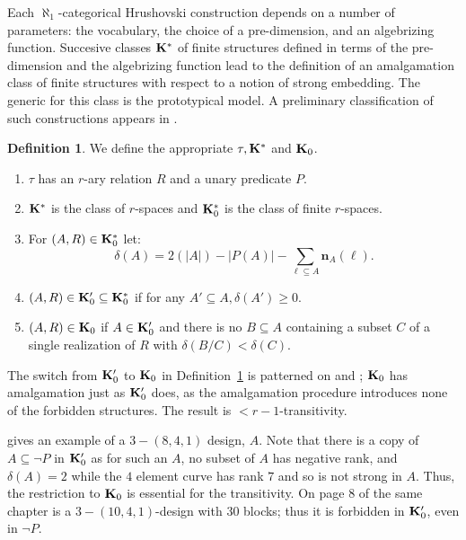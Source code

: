 \documentclass[11pt]{amsart}
\def\bK{{\bf K}}
\def\bL{{\bf L}}
\theoremstyle{definition}
\newtheorem{definition}[theorem]{Definition}
\theoremstyle{remark}
\numberwithin{equation}{section}
\begin{document}
Each $\aleph_1$-categorical Hrushovski  construction depends on a number of parameters: the vocabulary, the choice of a pre-dimension, and an algebrizing function.
Succesive classes  $\bK^*$ of finite structures defined in terms of the pre-dimension and the  algebrizing function lead to the definition of an amalgamation class of finite structures with respect to a notion of strong embedding. The generic for this class is the prototypical model. A preliminary classification of such constructions appears in \cite{BaldwinVer}.

\begin{definition}\label{defdelrank} We define the appropriate $\tau, \bK^*$ and $\bK_0$.
\begin{enumerate}
\item %
$\tau$ has an $r$-ary relation $R$ and a unary predicate $P$.
 \item  $\bK^*$ is the class of  $r$-spaces
 and  $\bK^*_0$ is the class of  finite $r$-spaces.

 \item %
 For $(A,R) \in  \bK^*_0$ let:
	$$\delta(A) = 2(|A|) -|P(A)| - \sum_{\ell \subseteq A} \mathbf{n}_A(\ell).$$

\item  %
$(A,R) \in  \bK'_0 \subseteq \bK^*_0$ if for any $A' \subseteq A, \delta(A') \geq 0$.

\item $(A,R) \in  \bK_0$ if $A\in  \bK'_0$ and there is no $B\subseteq A$
    containing a subset $C$ of a single realization of $R$ with
    $\delta(B/C) < \delta(C)$.


\end{enumerate}
\end{definition}

 The switch from $\bK'_0$ to
$\bK_0$ in Definition~\ref{defdelrank} is patterned on
\cite[Proposition 18]{Hrustrongmin} and \cite{Baldwinautpp}; $\bK_0$ has amalgamation just
 as $\bK'_0$ does,
 as the amalgamation procedure
introduces none of the forbidden structures. The result is $<r-1$-transitivity.


\cite[page 6]{Kaveh} gives an
example of a $3-(8,4,1)$ design, $A$.  Note that there is a copy of $A
\subseteq \neg P$ in $\bK'_0$ as for such an $A$, no subset of $A$ has
negative rank,  and $\delta(A) =2 $ while the $4$ element curve has rank $7$
and so is not strong in $A$. Thus, the restriction to $\bK_0$ is essential
for the transitivity.   On page 8 of the same chapter is
a $3-(10,4,1)$-design  with 30 blocks; thus it is forbidden in $\bK'_0$, even in
$\neg P$.
\end{document}

